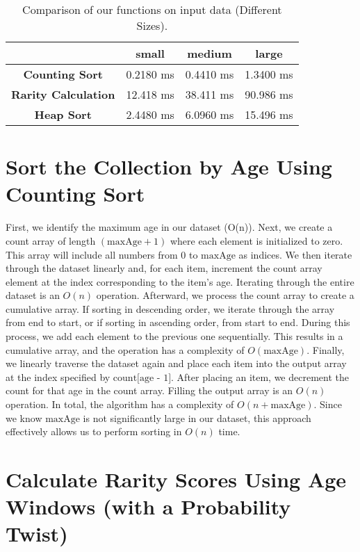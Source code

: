 \label{implementation}

\begin{table}[h!]
\centering
\begin{tabular}{|c|c|c|c|}
\hline
& \textbf{small} & \textbf{medium} & \textbf{large} \\ \hline
\textbf{Counting Sort} & 0.2180 ms & 0.4410 ms & 1.3400 ms \\ \hline
\textbf{Rarity Calculation} & 12.418 ms & 38.411 ms & 90.986 ms \\ \hline
\textbf{Heap Sort} & 2.4480 ms & 6.0960 ms & 15.496 ms \\ \hline
\end{tabular}
\caption{Comparison of our functions on input data (Different Sizes).}
\label{dataSize}
\end{table}

\section{Sort the Collection by Age Using Counting Sort}

First, we identify the maximum age in our dataset (O(n)). Next, we create a count array of length \( (\text{maxAge} + 1) \) where each element is initialized to zero. This array will include all numbers from 0 to \(\text{maxAge}\) as indices. We then iterate through the dataset linearly and, for each item, increment the count array element at the index corresponding to the item's age. Iterating through the entire dataset is an \( O(n) \) operation. Afterward, we process the count array to create a cumulative array. If sorting in descending order, we iterate through the array from end to start, or if sorting in ascending order, from start to end. During this process, we add each element to the previous one sequentially. This results in a cumulative array, and the operation has a complexity of \( O(\text{maxAge}) \). Finally, we linearly traverse the dataset again and place each item into the output array at the index specified by \(\text{count[age - 1]}\). After placing an item, we decrement the count for that age in the count array. Filling the output array is an \( O(n) \) operation. In total, the algorithm has a complexity of \( O(n + \text{maxAge}) \). Since we know \(\text{maxAge}\) is not significantly large in our dataset, this approach effectively allows us to perform sorting in \( O(n) \) time.

\section{Calculate Rarity Scores Using Age Windows (with a Probability Twist)}

